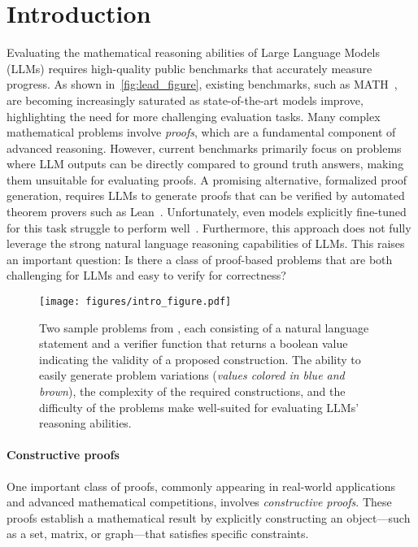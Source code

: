 \vspace{-4mm}
\section{Introduction} \label{sec:intro}
Evaluating the mathematical reasoning abilities of Large Language Models (LLMs) requires high-quality public benchmarks that accurately measure progress. 
As shown in~\cref{fig:lead_figure}, existing benchmarks, such as MATH~\citep{hendrycks2021math}, are becoming increasingly saturated as state-of-the-art models improve, highlighting the need for more challenging evaluation tasks. 
Many complex mathematical problems involve \textit{proofs}, which are a fundamental component of advanced reasoning. However, current benchmarks primarily focus on problems where LLM outputs can be directly compared to ground truth answers, making them unsuitable for evaluating proofs. A promising alternative, formalized proof generation, requires LLMs to generate proofs that can be verified by automated theorem provers such as Lean~\citep{lean}. Unfortunately, even models explicitly fine-tuned for this task struggle to perform well~\citep{xin2024deepseekprover}. Furthermore, this approach does not fully leverage the strong natural language reasoning capabilities of LLMs. This raises an important question: Is there a class of proof-based problems that are both challenging for LLMs and easy to verify for correctness?


\begin{figure*}[t]
    \centering
    \texttt{[image: figures/intro\_figure.pdf]}
    \caption{Two sample problems from \mc, each consisting of a  natural language statement and a verifier function that returns a boolean value indicating the validity of a proposed construction. The ability to easily generate problem variations (\emph{values colored in blue and brown}), the complexity of the required constructions, and the difficulty of the problems make \mc well-suited for evaluating LLMs' reasoning abilities.}
    \label{fig:intro}
\end{figure*}


\paragraph{Constructive proofs}
One important class of proofs, commonly appearing in real-world applications and advanced mathematical competitions, involves \textit{constructive proofs}. These proofs establish a mathematical result by explicitly constructing an object---such as a set, matrix, or graph---that satisfies specific constraints.

